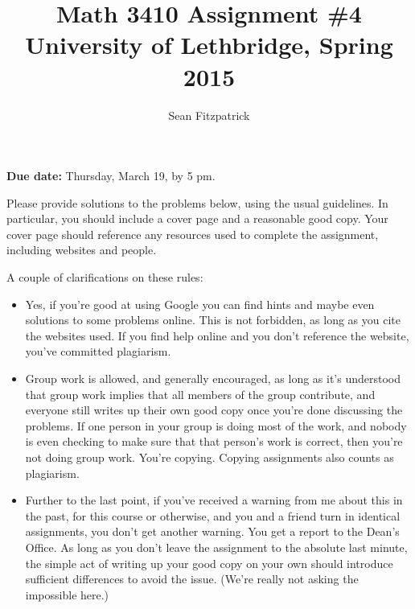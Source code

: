 \documentclass[letterpaper,12pt]{article}
\title{Math 3410 Assignment \#4\\University of Lethbridge, Spring 2015}
\author{Sean Fitzpatrick}
\begin{document}
 \maketitle

{\bf Due date:} Thursday, March 19, by 5 pm.

\bigskip

Please provide solutions to the problems below, using the usual guidelines. In particular, you should include a cover page and a reasonable good copy. Your cover page should reference any resources used to complete the assignment, including websites and people. 

A couple of clarifications on these rules:
\begin{itemize}
\item Yes, if you're good at using Google you can find hints and maybe even solutions to some problems online. This is not forbidden, as long as you cite the websites used. If you find help online and you don't reference the website, you've committed plagiarism.
\item Group work is allowed, and generally encouraged, as long as it's understood that group work implies that all members of the group contribute, and everyone still writes up their own good copy once you're done discussing the problems. If one person in your group is doing most of the work, and nobody is even checking to make sure that that person's work is correct, then you're not doing group work. You're copying. Copying assignments also counts as plagiarism. 
\item Further to the last point, if you've received a warning from me about this in the past, for this course or otherwise, and you and a friend turn in identical assignments, you don't get another warning. You get a report to the Dean's Office. As long as you don't leave the assignment to the absolute last minute, the simple act of writing up your good copy on your own should introduce sufficient differences to avoid the issue. (We're really not asking the impossible here.)
\end{itemize}
\end{document}
